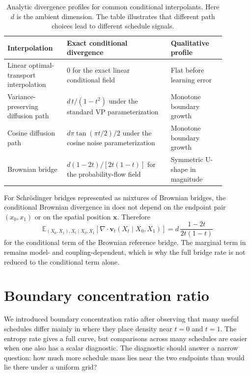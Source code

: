 \documentclass{article}
\newcommand{\E}{\mathbb{E}}
\newcommand{\vx}{\bm{x}}
\newcommand{\vv}{\bm{v}}
\newcommand{\diver}{\nabla\!\cdot}
\theoremstyle{plain}
\theoremstyle{definition}
\theoremstyle{remark}
\begin{document}
\begin{table}[H]
  \caption{Analytic divergence profiles for common conditional interpolants. Here $d$ is the ambient dimension. The table illustrates that different path choices lead to different schedule signals.}
  \label{tab:interpolation_profiles}
  \centering
  \small
  \begin{tabular}{P{0.24\linewidth}P{0.42\linewidth}P{0.22\linewidth}}
    \toprule
    Interpolation & Exact conditional divergence & Qualitative profile \\
    \midrule
    Linear optimal-transport interpolation & $0$ for the exact linear conditional field & Flat before learning error \\
    Variance-preserving diffusion path & $d\,t/(1-t^2)$ under the standard VP parameterization & Monotone boundary growth \\
    Cosine diffusion path & $d\pi\tan(\pi t/2)/2$ under the cosine noise parameterization & Monotone boundary growth \\
    Brownian bridge & $d(1-2t)/[2t(1-t)]$ for the probability-flow field & Symmetric U-shape in magnitude \\
    \bottomrule
  \end{tabular}
\end{table}

For Schr\"odinger bridges represented as mixtures of Brownian bridges, the conditional Brownian divergence in  does not depend on the endpoint pair $(x_0,x_1)$ or on the spatial position $\vx$. Therefore
\begin{equation}
  \E_{(X_0,X_1),X_t\mid X_0,X_1}
  \left[\diver\vv_t(X_t\mid X_0,X_1)\right]
  =
  d\,\frac{1-2t}{2t(1-t)}
\end{equation}
for the conditional term of the Brownian reference bridge. The marginal term in  remains model- and coupling-dependent, which is why the full bridge rate is not reduced to the conditional term alone.

\section{Boundary concentration ratio}
\label{app:bcr}

We introduced boundary concentration ratio after observing that many useful schedules differ mainly in where they place density near $t=0$ and $t=1$. The entropy rate gives a full curve, but comparisons across many schedules are easier when one also has a scalar diagnostic. The diagnostic should answer a narrow question: how much more schedule mass lies near the two endpoints than would lie there under a uniform grid?
\end{document}
